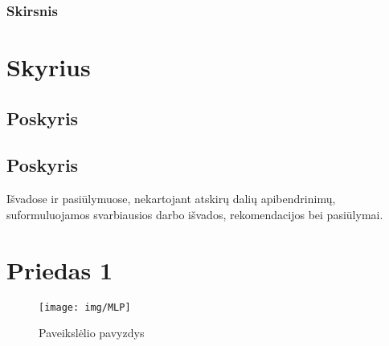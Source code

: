 \documentclass{VUMIFInfKursinis}
\begin{document}
\subsubsection{Skirsnis}
\section{Skyrius}
\subsection{Poskyris}
\subsection{Poskyris}

Išvadose ir pasiūlymuose, nekartojant atskirų dalių apibendrinimų,
suformuluojamos svarbiausios darbo išvados, rekomendacijos bei pasiūlymai.

\printbibliography[heading=bibintoc] %

\appendix  %

\section{Priedas 1}
\begin{figure}[H]
    \centering
    \texttt{[image: img/MLP]}
    \caption{Paveikslėlio pavyzdys}   %
    \label{img:mlp}
\end{figure}
\end{document}
